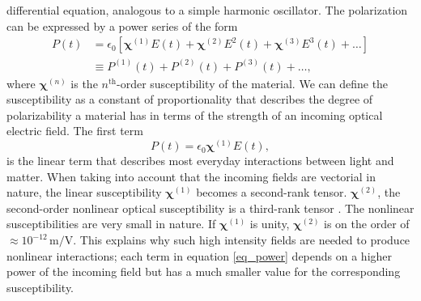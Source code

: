 differential equation, analogous to a simple harmonic oscillator. The
polarization can be expressed by a power series of the form
\begin{align}
{P}(t)
&= \epsilon_{0}\left[\boldsymbol{\chi}^{(1)}{E}(t) 
 + \boldsymbol{\chi}^{(2)}{E}^{2}(t)
 + \boldsymbol{\chi}^{(3)}{E}^{3}(t)
 + \ldots\right]\label{eq_power}\\
&\equiv {P}^{(1)}(t) + {P}^{(2)}(t) + {P}^{(3)}(t) + \ldots,
\end{align}
where $\boldsymbol{\chi}^{(n)}$ is the $n^{\mathrm{th}}$-order susceptibility of the
material. We can define the susceptibility as a constant of proportionality
that describes the degree of polarizability a material has in terms of the
strength of an incoming optical electric field. The first term
\begin{equation}
P(t) = \epsilon_{0}\boldsymbol{\chi}^{(1)}E(t),
\end{equation}
is the linear term that describes most everyday interactions between light and
matter. When taking into account that the incoming fields are vectorial in
nature, the linear susceptibility $\boldsymbol{\chi}^{(1)}$ becomes a second-rank tensor.
$\boldsymbol{\chi}^{(2)}$, the second-order nonlinear optical susceptibility is a third-rank
tensor \cite{boyd2003nonlinear}. The nonlinear susceptibilities are very small
in nature. If $\boldsymbol{\chi}^{(1)}$ is unity, $\boldsymbol{\chi}^{(2)}$ is on the order of $\approx
10^{-12}\,\text{m/V}$. This explains why such high intensity fields are needed
to produce nonlinear interactions; each term in equation \eqref{eq_power}
depends on a higher power of the incoming field but has a much smaller value for
the corresponding susceptibility.

